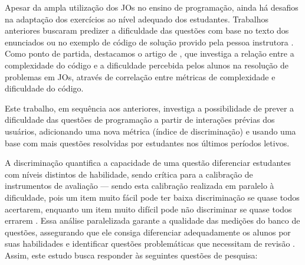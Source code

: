 \documentclass[12pt]{article}
\begin{document}
Apesar da ampla utilização dos JOs no ensino de programação, ainda há desafios na adaptação dos exercícios ao nível adequado dos estudantes. Trabalhos anteriores buscaram predizer a dificuldade das questões com base no texto dos enunciados \cite{santos2019} ou no exemplo de código de solução provido pela pessoa instrutora \cite{marcos2021,elrik2022}. Como ponto de partida, destacamos o artigo de \cite{jackson2023}, que  investiga a relação entre a complexidade do código e a dificuldade percebida pelos alunos na resolução de problemas em JOs, através de correlação entre métricas de complexidade e dificuldade do código.

Este trabalho, em sequência aos anteriores, investiga a possibilidade de prever a dificuldade das questões de programação a partir de interações prévias dos usuários, adicionando uma nova métrica (índice de discriminação) e usando uma base com mais questões resolvidas por estudantes nos últimos períodos letivos.

A discriminação quantifica a capacidade de uma questão diferenciar estudantes com níveis distintos de habilidade, sendo crítica para a calibração de instrumentos de avaliação --- sendo esta calibração realizada em paralelo à dificuldade, pois um item muito fácil pode ter baixa discriminação se quase todos acertarem, enquanto um item muito difícil pode não discriminar se quase todos errarem \cite{Liz2020}. Essa análise paralelizada garante a qualidade das medições do banco de questões, assegurando que ele consiga diferenciar adequadamente os alunos por suas habilidades e identificar questões problemáticas que necessitam de revisão \cite{Liz2020}. Assim, este estudo busca responder às seguintes questões de pesquisa:
\end{document}
